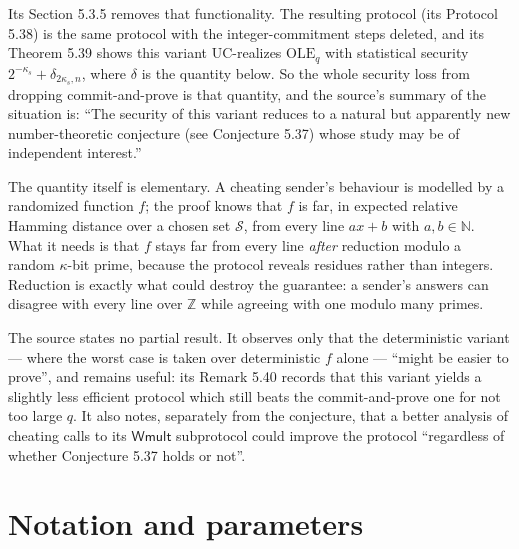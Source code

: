 \documentclass{aicr-conjecture}
\newcommand{\N}{\mathbb{N}}
\newcommand{\Sc}{\mathcal{S}}
\begin{document}
Its Section 5.3.5 removes that functionality. The resulting protocol
(its Protocol 5.38) is the same protocol with the integer-commitment
steps deleted, and its Theorem 5.39 shows this variant UC-realizes
$\mathrm{OLE}_{q}$ with statistical security $2^{-\kappa_{s}} +
\delta_{2\kappa_{s}, n}$, where $\delta$ is the quantity below. So the
whole security loss from dropping commit-and-prove is that quantity, and
the source's summary of the situation is: ``The security of this variant
reduces to a natural but apparently new number-theoretic conjecture (see
Conjecture 5.37) whose study may be of independent interest.''

The quantity itself is elementary. A cheating sender's behaviour is
modelled by a randomized function $f$; the proof knows that $f$ is far,
in expected relative Hamming distance over a chosen set $\Sc$, from
every line $ax + b$ with $a, b \in \N$. What it needs is that $f$ stays
far from every line \emph{after} reduction modulo a random
$\kappa$-bit prime, because the protocol reveals residues rather than
integers. Reduction is exactly what could destroy the guarantee: a
sender's answers can disagree with every line over $\mathbb{Z}$ while
agreeing with one modulo many primes.

The source states no partial result. It observes only that the
deterministic variant --- where the worst case is taken over
deterministic $f$ alone --- ``might be easier to prove'', and remains
useful: its Remark 5.40 records that this variant yields a slightly less
efficient protocol which still beats the commit-and-prove one for not too
large $q$. It also notes, separately from the conjecture, that a better
analysis of cheating calls to its $\mathsf{Wmult}$ subprotocol could
improve the protocol ``regardless of whether Conjecture 5.37 holds or
not''.

\section{Notation and parameters}\label{sec:notation}
\end{document}
